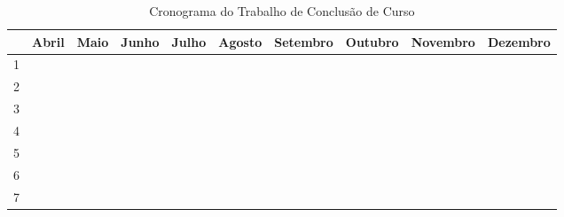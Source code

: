 \begin{table}[h]
\centering
\caption{Cronograma do Trabalho de Conclusão de Curso}
\label{tab:cronograma}
\begin{tabular}{|c|c|c|c|c|c|c|c|c|c|}
\hline
   & Abril                    & Maio                     & Junho                    & Julho                    & Agosto                   & Setembro                 & Outubro                  & Novembro                 & Dezembro                 \\ \hline
1  & \cellcolor[HTML]{9B9B9B} & \cellcolor[HTML]{9B9B9B} &                          &                          &                          &                          &                          &                          &                          \\ \hline
2  & \cellcolor[HTML]{9B9B9B} & \cellcolor[HTML]{9B9B9B} & \cellcolor[HTML]{9B9B9B} & \cellcolor[HTML]{9B9B9B} & \cellcolor[HTML]{9B9B9B} & \cellcolor[HTML]{9B9B9B} & \cellcolor[HTML]{9B9B9B} &                          &                          \\ \hline
3  &                          & \cellcolor[HTML]{9B9B9B} & \cellcolor[HTML]{9B9B9B} &                          &                          &                          &                          &                          &                          \\ \hline
4  &                          & \cellcolor[HTML]{9B9B9B} & \cellcolor[HTML]{9B9B9B} & \cellcolor[HTML]{9B9B9B} &                          &                          &                          &                          &                          \\ \hline
5  &                          & \cellcolor[HTML]{9B9B9B} & \cellcolor[HTML]{9B9B9B} & \cellcolor[HTML]{9B9B9B} & \cellcolor[HTML]{9B9B9B} &                          &                          &                          &                          \\ \hline
6  &                          &                          &                          &                          & \cellcolor[HTML]{9B9B9B} &                          &                          &                          &                          \\ \hline
7  &                          &                          &                          &                          & \cellcolor[HTML]{9B9B9B} & \cellcolor[HTML]{9B9B9B} & \cellcolor[HTML]{9B9B9B} &                          &                          \\ \hline

\end{tabular}
\end{table}
